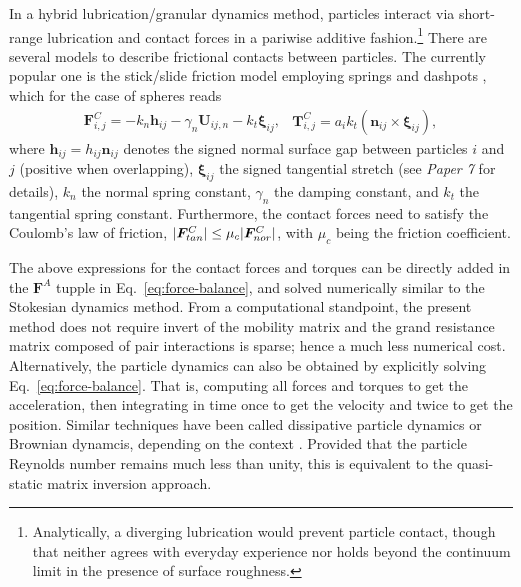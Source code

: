 In a hybrid lubrication/granular dynamics method, particles interact via short-range lubrication and contact forces in a pariwise additive fashion.\footnote{Analytically, a diverging lubrication would prevent particle contact, though that neither agrees with everyday experience nor holds beyond the continuum limit in the presence of surface roughness.}
There are several models to describe frictional contacts between particles. The currently popular one is the 
stick/slide friction model employing springs and dashpots \citep{Luding2008}, which for the case of spheres reads
\begin{subequations} \label{eq:hlcd-contact}
  \begin{equation} 
    \begin{aligned}
      {\bm F}^C_{i,j} = -k_n {\bm h}_{ij}  - \gamma_n \bm{U}_{ij,n} - k_t {\bm \xi}_{ij},
    \end{aligned}
    \label{col F}
  \end{equation}
  \begin{equation} 
    \begin{aligned}
      {\bm T}^C_{i,j} = a_{i} k_t ({\bm n}_{ij} \times {\bm \xi}_{ij}),
    \end{aligned}
  \end{equation}
\end{subequations}
where ${\bm h}_{ij}=h_{ij}{\bm n}_{ij}$ denotes the signed normal surface gap between particles $i$ and $j$ (positive when overlapping),
${\bm \xi}_{ij}$ the signed tangential stretch (see \emph{Paper 7} for details),
$k_n$ the normal spring constant,
$\gamma_n$ the damping constant,
and $k_t$ the tangential spring constant.
Furthermore, the contact forces need to satisfy the Coulomb's law of friction, \ie $\lvert\bm{F}^C_{tan}\rvert \leq \mu_c\lvert\bm{F}^C_{nor}\rvert$, with $\mu_c$ being the friction coefficient. 

The above expressions for the contact forces and torques can be directly added in the ${\bm F}^A$ tupple in Eq.\ \eqref{eq:force-balance}, and solved numerically similar to the Stokesian dynamics method.
From a computational standpoint, the present method does not require invert of the mobility matrix and the grand resistance matrix composed of pair interactions is sparse; hence a much less numerical cost.
Alternatively, the particle dynamics can also be obtained by explicitly solving Eq.\ \eqref{eq:force-balance}. That is, computing all forces and torques to get the acceleration, then integrating in time once to get the velocity and twice to get the position.
Similar techniques have been called dissipative particle dynamics or Brownian dynamcis, depending on the context \citep{Hoogerbrugge_1992, Groot_Warren_1997}.
Provided that the particle Reynolds number remains much less than unity, this is equivalent to the quasi-static matrix inversion approach.



